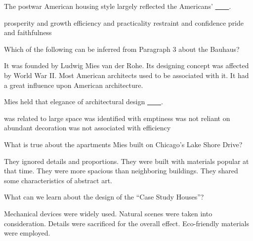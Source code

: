 \item The postwar American housing style largely reflected the Americans' \uline{~~~~}.
\begin{tasks}
	\task prosperity and growth
	\task efficiency and practicality
	\task restraint and confidence
	\task pride and faithfulness
\end{tasks}
\item Which of the following can be inferred from Paragraph 3 about the Bauhaus?
\begin{tasks}
	\task It was founded by Ludwig Mies van der Rohe.
	\task Its designing concept was affected by World War II.
	\task Most American architects used to be associated with it.
	\task It had a great influence upon American architecture.
\end{tasks}
\item Mies held that elegance of architectural design \uline{~~~~}.
\begin{tasks}
	\task was related to large space
	\task was identified with emptiness
	\task was not reliant on abundant decoration
	\task was not associated with efficiency
\end{tasks}
\item What is true about the apartments Mies built on Chicago's Lake Shore Drive?
\begin{tasks}
	\task They ignored details and proportions.
	\task They were built with materials popular at that time.
	\task They were more spacious than neighboring buildings.
	\task They shared some characteristics of abstract art.
\end{tasks}
\item What can we learn about the design of the ``Case Study Houses''?
\begin{tasks}
	\task Mechanical devices were widely used.
	\task Natural scenes were taken into consideration.
	\task Details were sacrificed for the overall effect.
	\task Eco-friendly materials were employed.
\end{tasks}
